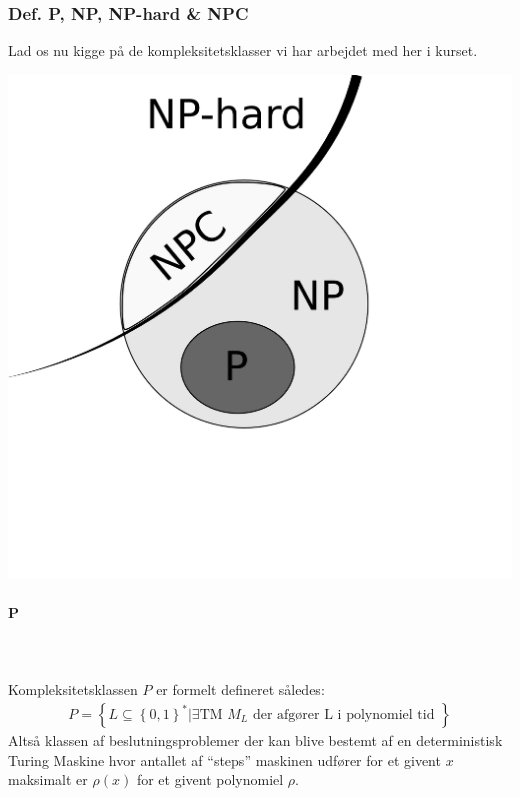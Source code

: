 \subsubsection{Def. P, NP, NP-hard \& NPC}

Lad os nu kigge på de kompleksitetsklasser vi har arbejdet med her i
kurset.
\begin{center}
 \includegraphics[bb=0 0 400 400,scale=0.3]{img/PNPNPC.png}
\end{center}


\paragraph{P}
~\\
~\\
Kompleksitetsklassen $P$ er formelt defineret således:
\begin{align*}
 P = \left\lbrace L \subseteq \left\lbrace 0,1 \right\rbrace^* | \exists \text{
TM } M_L \text{ der afgører L i polynomiel tid } \right\rbrace
\end{align*}
Altså klassen af beslutningsproblemer der kan blive bestemt af en
deterministisk Turing Maskine hvor antallet af ``steps'' maskinen
udfører for
et givent $x$ maksimalt er $\rho(x)$ for et givent polynomiel $\rho$.\\
 
